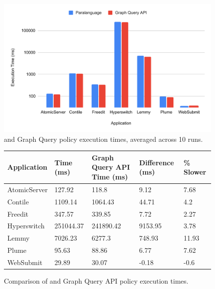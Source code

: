 \begin{figure}
    \begin{centering}
        \includegraphics[scale=0.7]{graphics/times.pdf}
        \caption{\syslang{} and Graph Query policy execution times, averaged across 10 runs.}
        \label{f:times}
    \end{centering}
\end{figure}
%
\begin{figure}
    \begin{tabular}{|l|p{3cm}|p{3.5cm}|p{2cm}|p{3cm}|}
        \hline
        \textbf{Application} & \textbf{\syslang{} Time (ms)} & \textbf{Graph Query API Time (ms)} & \textbf{Difference (ms)} & \textbf{\syslang{} \% Slower} \\ \hline
        AtomicServer & 127.92    & 118.8     & 9.12    & 7.68  \\ \hline
        Contile      & 1109.14   & 1064.43   & 44.71   & 4.2   \\ \hline
        Freedit      & 347.57    & 339.85    & 7.72    & 2.27  \\ \hline
        Hyperswitch  & 251044.37 & 241890.42 & 9153.95 & 3.78  \\ \hline
        Lemmy        & 7026.23   & 6277.3    & 748.93  & 11.93 \\ \hline
        Plume        & 95.63     & 88.86     & 6.77    & 7.62  \\ \hline
        WebSubmit    & 29.89     & 30.07     & -0.18   & -0.6  \\ \hline               
        \end{tabular}
        \caption{Comparison of \syslang{} and Graph Query API policy execution times.}
        \label{f:percentages}
\end{figure}
